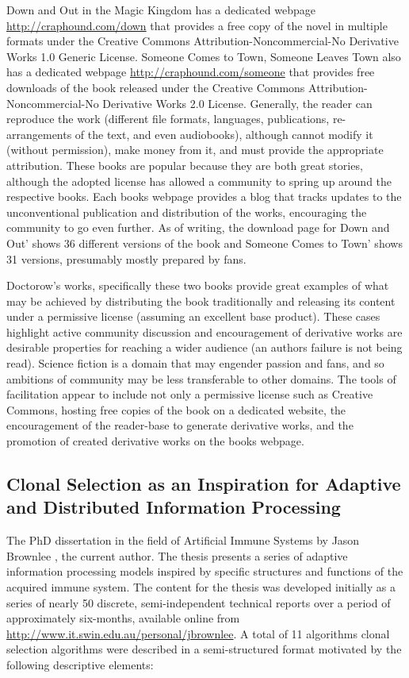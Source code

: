 \documentclass[a4paper, 11pt]{article}
\begin{document}
Down and Out in the Magic Kingdom has a dedicated webpage \url{http://craphound.com/down} that provides a free copy of the novel in multiple formats under the Creative Commons Attribution-Noncommercial-No Derivative Works 1.0 Generic License. Someone Comes to Town, Someone Leaves Town also has a dedicated webpage \url{http://craphound.com/someone} that provides free downloads of the book released under the Creative Commons Attribution-Noncommercial-No Derivative Works 2.0 License. Generally, the reader can reproduce the work (different file formats, languages, publications, re-arrangements of the text, and even audiobooks), although cannot modify it (without permission), make money from it, and must provide the appropriate attribution. These books are popular because they are both great stories, although the adopted license has allowed a community to spring up around the respective books. Each books webpage provides a blog that tracks updates to the unconventional publication and distribution of the works, encouraging the community to go even further. As of writing, the download page for Down and Out' shows 36 different versions of the book and Someone Comes to Town' shows 31 versions, presumably mostly prepared by fans.

Doctorow's works, specifically these two books provide great examples of what may be achieved by distributing the book traditionally and releasing its content under a permissive license (assuming an excellent base product). These cases highlight active community discussion and encouragement of derivative works are desirable properties for reaching a wider audience (an authors failure is not being read). Science fiction is a domain that may engender passion and fans, and so ambitions of community may be less transferable to other domains. The tools of facilitation appear to include not only a permissive license such as Creative Commons, hosting free copies of the book on a dedicated website, the encouragement of the reader-base to generate derivative works, and the promotion of created derivative works on the books webpage.

% 
% 
\subsection{Clonal Selection as an Inspiration for Adaptive and Distributed Information Processing}
\label{subsec:dissertation}
The PhD dissertation in the field of Artificial Immune Systems by Jason Brownlee \cite{Brownlee2008}, the current author. The thesis presents a series of adaptive information processing models inspired by specific structures and functions of the acquired immune system. The content for the thesis was developed initially as a series of nearly 50 discrete, semi-independent technical reports over a period of approximately six-months, available online from \url{http://www.it.swin.edu.au/personal/jbrownlee}. A total of 11 algorithms clonal selection algorithms were described in a semi-structured format motivated by the following descriptive elements:
\end{document}
